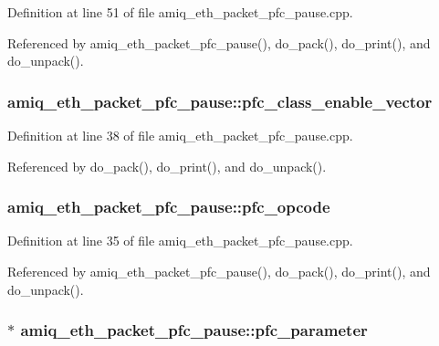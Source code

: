 Definition at line 51 of file amiq\_\-eth\_\-packet\_\-pfc\_\-pause.cpp.

Referenced by amiq\_\-eth\_\-packet\_\-pfc\_\-pause(), do\_\-pack(), do\_\-print(), and do\_\-unpack().\hypertarget{classamiq__eth__packet__pfc__pause_a9f34f218b2b2fdb3f9459277a465f220}{
\subsubsection[{pfc\_\-class\_\-enable\_\-vector}]{ {\bf amiq\_\-eth\_\-packet\_\-pfc\_\-pause::pfc\_\-class\_\-enable\_\-vector}}}
\label{classamiq__eth__packet__pfc__pause_a9f34f218b2b2fdb3f9459277a465f220}


Definition at line 38 of file amiq\_\-eth\_\-packet\_\-pfc\_\-pause.cpp.

Referenced by do\_\-pack(), do\_\-print(), and do\_\-unpack().\hypertarget{classamiq__eth__packet__pfc__pause_a3248fdfd92b4e26b170f0bd2d0d26229}{
\subsubsection[{pfc\_\-opcode}]{ {\bf amiq\_\-eth\_\-packet\_\-pfc\_\-pause::pfc\_\-opcode}}}
\label{classamiq__eth__packet__pfc__pause_a3248fdfd92b4e26b170f0bd2d0d26229}


Definition at line 35 of file amiq\_\-eth\_\-packet\_\-pfc\_\-pause.cpp.

Referenced by amiq\_\-eth\_\-packet\_\-pfc\_\-pause(), do\_\-pack(), do\_\-print(), and do\_\-unpack().\hypertarget{classamiq__eth__packet__pfc__pause_a3cb76fb31642258056bfb06d8844b0cf}{
\subsubsection[{pfc\_\-parameter}]{$\ast$ {\bf amiq\_\-eth\_\-packet\_\-pfc\_\-pause::pfc\_\-parameter}}}
\label{classamiq__eth__packet__pfc__pause_a3cb76fb31642258056bfb06d8844b0cf}


